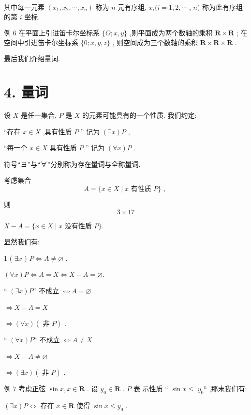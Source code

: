 其中每一元素 $\left( {{x}_{1},{x}_{2},\cdots ,{x}_{n}}\right)$ 称为 $n$ 元有序组, ${x}_{i}(i = 1,2,\cdots$ , $n)$ 称为此有序组的第 $i$ 坐标.

例 6 在平面上引进笛卡尔坐标系 $\{ O;x,y\}$ ,则平面成为两个数轴的乘积 $\mathbf{R} \times  \mathbf{R}$ ; 在空间中引进笛卡尔坐标系 $\{ 0;x,y,z\}$ , 则空间成为三个数轴的乘积 $\mathbf{R} \times  \mathbf{R} \times  \mathbf{R}$ .

最后我们介绍量词.

\section*{4. 量词}

设 $X$ 是任一集合, $P$ 是 $X$ 的元素可能具有的一个性质. 我们约定:

“存在 $x \in  X$ ,具有性质 $P$ ” 记为 $\left( {\exists x}\right) P$ ,

“每一个 $x \in  X$ 具有性质 $P$ ” 记为 $\left( {\forall x}\right) P$ .

符号“ヨ”与“∀”分别称为存在量词与全称量词.

考虑集合
$$A = \{ x \in  X \mid  x\text{ 有性质 }P\} \text{ , }$$

则
$$3 \times  {17}$$

$X - A = \{ x \in  X \mid  x$ 没有性质 $P\} .$

显然我们有:

1 ( $\exists x$ ) $P \Leftrightarrow  A \neq  \varnothing$ .

$\left( {\forall x}\right) P \Leftrightarrow  A = X \Leftrightarrow  X - A = \varnothing .$

“ $\left( {\exists x}\right) {P}^{n}$ 不成立 $\Leftrightarrow  A = \varnothing$

$\Leftrightarrow  X - A = X$

$\Leftrightarrow  \left( {\forall x}\right) \left( {\text{ 非 }P}\right)$ .

“ $\left( {\forall x}\right) {P}^{n}$ 不成立 $\Leftrightarrow  A \neq  X$

$\Leftrightarrow  X - A \neq  \varnothing$

$\Leftrightarrow  \left( {\exists x}\right) \left( {\text{ 非 }P}\right)$ .

例 7 考虑正弦 $\sin x,x \in  \mathbf{R}$ . 设 ${y}_{0} \in  \mathbf{R}$ . $P$ 表 示性质 “ $\sin x \leq$  ${y}_{0}{}^{n}$ ,那末我们有:

$\left( {\exists x}\right) P \Leftrightarrow$ 存在 $x \in  \mathbf{R}$ 使得 $\sin x \leq  {y}_{0}$ .


